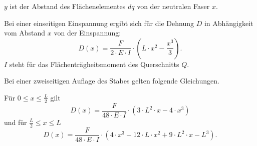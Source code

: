 $y$ ist der Abstand des Flächenelementes $dq$ von der neutralen Faser $x$.

Bei einer einseitigen Einspannung ergibt sich für die Dehnung $D$ in Abhängigkeit vom Abstand $x$ von der Einspannung:
\begin{equation}
    D(x) = \frac{F}{2 \cdot E \cdot I} \cdot (L \cdot x^2 - \frac{x^3}{3}) .
\end{equation}
$I$ steht für das Flächenträgheitsmoment des Querschnitts $Q$.

Bei einer zweiseitigen Auflage des Stabes gelten folgende Gleichungen.

Für $0 \leq x \leq \frac{L}{2}$ gilt 
\begin{equation}
    D(x) = \frac{F}{48 \cdot E \cdot I} \cdot (3 \cdot L^2 \cdot x - 4 \cdot x^3)
\end{equation}
und für $\frac{L}{2} \leq x \leq L$
\begin{equation}
    D(x) = \frac{F}{48 \cdot E \cdot I} \cdot (4 \cdot x^3 - 12 \cdot L \cdot x^2 + 9 \cdot L^2 \cdot x - L^3) .
\end{equation}
